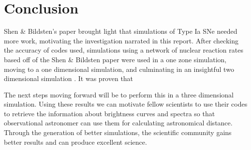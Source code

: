 \documentclass[preprint]{aastex62}
\begin{document}

\section{Conclusion}

  
  Shen \& Bildsten's paper brought light that simulations of Type Ia SNe needed more work, motivating the investigation narrated in this report. After checking the accuracy of codes used, simulations using a network of nuclear reaction rates based off of the Shen \& Bildsten paper were used in a one zone simulation, moving to a one dimensional simulation, and culminating in an insightful two dimensional simulation \citep{shenNbildsten}. It was proven that %
  
  The next steps moving forward will be to perform this in a three dimensional simulation. Using these results we can motivate fellow scientists to use their codes to retrieve the information about brightness curves and spectra so that observational astronomer can use them for calculating astronomical distance. Through the generation of better simulations, the scientific community gains better results and can produce excellent science. 


\end{document}
